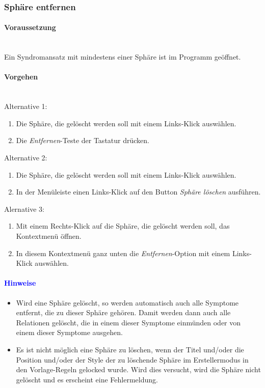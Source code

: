 \documentclass[enabledeprecatedfontcommands,fontsize=11pt,paper=a4,twoside]{scrartcl}
\newcounter{one}
\newcommand*{\hint}{\paragraph{\textcolor{blue}{Hinweise}}}
\newcommand*{\condition}{\paragraph{Voraussetzung}$\;$ \vspace{0.2cm}\\}
\newcommand*{\actions}{\paragraph{Vorgehen} $\;$\vspace{0.2cm}\\}
\begin{document}
		\subsubsection{Sphäre entfernen}
			\condition 	
		Ein Syndromansatz mit mindestens einer Sphäre ist im Programm geöffnet. 
		\actions  
		Alternative 1:
		\begin{enumerate}
			\item Die Sphäre, die gelöscht werden soll mit einem Links-Klick auswählen.
			\item Die \textit{Entfernen}-Teste der Tastatur drücken.
		\end{enumerate}
		Alternative 2:
			\begin{enumerate}
			\item Die Sphäre, die gelöscht werden soll mit einem Links-Klick auswählen.
			\item In der Menüleiste einen Links-Klick auf den Button \textit{Sphäre löschen} ausführen.
		\end{enumerate}
		Alernative 3:
		\begin{enumerate}
			\item Mit einem Rechts-Klick auf die Sphäre, die gelöscht werden soll, das Kontextmenü öffnen. 
			\item In diesem Kontextmenü ganz unten die \textit{Entfernen}-Option mit einem Links-Klick auswählen.
		\end{enumerate}
		\hint
		\begin{itemize}
			\item Wird eine Sphäre gelöscht, so werden automatisch auch alle Symptome entfernt, die zu dieser Sphäre gehören. Damit werden dann auch alle Relationen gelöscht, die in einem dieser Symptome einmünden oder von einem dieser Symptome ausgehen.
			\item Es ist nicht möglich eine Sphäre zu löschen, wenn der Titel und/oder die Position und/oder der Style der zu löschende Sphäre im Erstellermodus in den Vorlage-Regeln gelocked wurde. Wird dies versucht, wird die Sphäre nicht gelöscht und es erscheint eine Fehlermeldung.
		\end{itemize}
\end{document}
